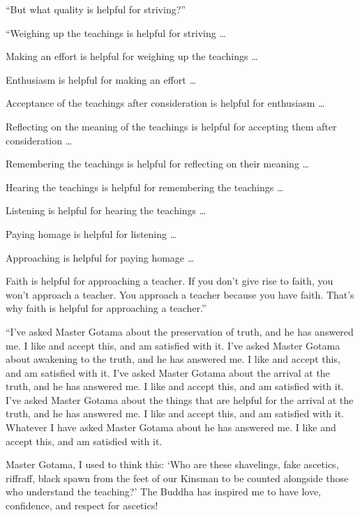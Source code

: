 \documentclass[12pt,openany]{book}%
\begin{document}
“But what quality is helpful for striving?” 

“Weighing up the teachings is helpful for striving … 

Making an effort is helpful for weighing up the teachings … 

Enthusiasm is helpful for making an effort … 

Acceptance of the teachings after consideration is helpful for enthusiasm … 

Reflecting on the meaning of the teachings is helpful for accepting them after consideration … 

Remembering the teachings is helpful for reflecting on their meaning … 

Hearing the teachings is helpful for remembering the teachings … 

Listening is helpful for hearing the teachings … 

Paying homage is helpful for listening … 

Approaching is helpful for paying homage … 

Faith is helpful for approaching a teacher. If you don’t give rise to faith, you won’t approach a teacher. You approach a teacher because you have faith. That’s why faith is helpful for approaching a teacher.” 

“I’ve asked Master Gotama about the preservation of truth, and he has answered me. I like and accept this, and am satisfied with it. I’ve asked Master Gotama about awakening to the truth, and he has answered me. I like and accept this, and am satisfied with it. I’ve asked Master Gotama about the arrival at the truth, and he has answered me. I like and accept this, and am satisfied with it. I’ve asked Master Gotama about the things that are helpful for the arrival at the truth, and he has answered me. I like and accept this, and am satisfied with it. Whatever I have asked Master Gotama about he has answered me. I like and accept this, and am satisfied with it. 

Master Gotama, I used to think this: ‘Who are these shavelings, fake ascetics, riffraff, black spawn from the feet of our Kinsman to be counted alongside those who understand the teaching?’ The Buddha has inspired me to have love, confidence, and respect for ascetics! 
\end{document}

